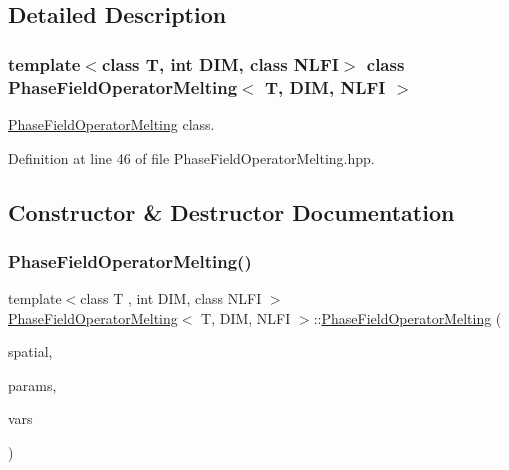 \subsection{Detailed Description}
\subsubsection*{template$<$class T, int D\+IM, class N\+L\+FI$>$\newline
class Phase\+Field\+Operator\+Melting$<$ T, D\+I\+M, N\+L\+F\+I $>$}

\hyperlink{classPhaseFieldOperatorMelting}{Phase\+Field\+Operator\+Melting} class. 

Definition at line 46 of file Phase\+Field\+Operator\+Melting.\+hpp.



\subsection{Constructor \& Destructor Documentation}
\mbox{\label{classPhaseFieldOperatorMelting_af5647432ef045bf3afd99400640ec233}} 
\subsubsection{\texorpdfstring{Phase\+Field\+Operator\+Melting()}{PhaseFieldOperatorMelting()}}
{\footnotesize\ttfamily template$<$class T , int D\+IM, class N\+L\+FI $>$ \\
\hyperlink{classPhaseFieldOperatorMelting}{Phase\+Field\+Operator\+Melting}$<$ T, D\+IM, N\+L\+FI $>$\+::\hyperlink{classPhaseFieldOperatorMelting}{Phase\+Field\+Operator\+Melting} (\begin{DoxyParamCaption}\item[{\hyperlink{classSpatialDiscretization}{Spatial\+Discretization}$<$ T, D\+IM $>$ $\ast$}]{spatial,  }\item[{const \hyperlink{classParameters}{Parameters} \&}]{params,  }\item[{\hyperlink{classVariables}{Variables}$<$ T, D\+IM $>$ \&}]{vars }\end{DoxyParamCaption})}



